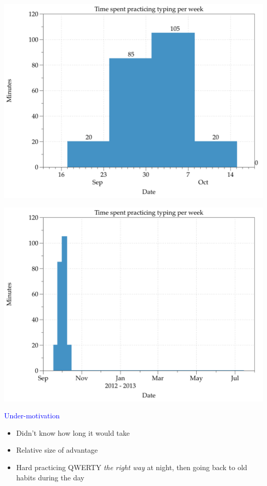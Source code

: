 \documentclass[landscape]{slides}
\begin{document}
\begin{slide}
    \includegraphics[width=\textwidth]{first-practice}
\end{slide}

\begin{slide}
    \includegraphics[width=\textwidth]{first-practice-long-tail}
\end{slide}


\begin{slide}

    \textcolor{blue}{\Large{Under-motivation}}

    \begin{itemize}
        \item Didn't know how long it would take
        \item Relative size of advantage
        \item Hard practicing QWERTY \emph{the right way} at night, then going back to old habits during the day
    \end{itemize}

\end{slide}
\end{document}
